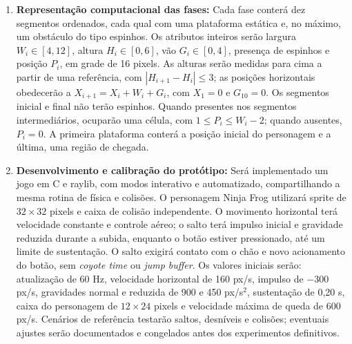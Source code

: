 \begin{enumerate}
  \item \textbf{Representação computacional das fases:} 
  Cada fase conterá dez segmentos ordenados, cada qual com uma plataforma 
  estática e, no máximo, um obstáculo do tipo espinhos. Os atributos inteiros 
  serão largura $W_i\in[4,12]$, altura $H_i\in[0,6]$, vão $G_i\in[0,4]$, 
  presença de espinhos e posição $P_i$, em grade de 16 pixels. As alturas 
  serão medidas para cima a partir de uma referência, com $|H_{i+1}-H_i|\leq3$; 
  as posições horizontais obedecerão a $X_{i+1}=X_i+W_i+G_i$, com $X_1=0$ e $G_{10}=0$. 
  Os segmentos inicial e final não terão espinhos. Quando presentes nos 
  segmentos intermediários, ocuparão uma célula, com $1\leq P_i\leq W_i-2$; 
  quando ausentes, $P_i=0$. A primeira plataforma conterá a posição inicial 
  do personagem e a última, uma região de chegada.

  \item \textbf{Desenvolvimento e calibração do protótipo:} 
  Será implementado um jogo em C e raylib, com modos interativo e automatizado, 
  compartilhando a mesma rotina de física e colisões. O personagem Ninja Frog 
  utilizará sprite de $32\times32$ pixels e caixa de colisão independente. 
  O movimento horizontal terá velocidade constante e controle aéreo; 
  o salto terá impulso inicial e gravidade reduzida durante a subida, 
  enquanto o botão estiver pressionado, até um limite de sustentação. O salto 
  exigirá contato com o chão e novo acionamento do botão, sem 
  \emph{coyote time} ou \emph{jump buffer}. Os valores iniciais serão: 
  atualização de 60 Hz, velocidade horizontal de 160 px/s, impulso de 
  $-300$ px/s, gravidades normal e reduzida de 900 e 450 px/s$^2$, 
  sustentação de 0,20 s, caixa do personagem de $12\times24$ pixels e 
  velocidade máxima de queda de 600 px/s. Cenários de referência testarão 
  saltos, desníveis e colisões; eventuais ajustes serão documentados e 
  congelados antes dos experimentos definitivos.


\end{enumerate}
